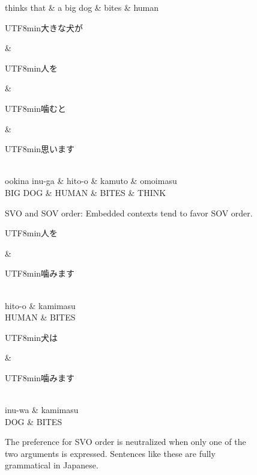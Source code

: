 \documentclass[11pt,a4paper]{article}
\newcommand{\japanese}[1]{\begin{CJK}{UTF8}{min}#1\end{CJK}}
\begin{document}
\begin{figure}
\begin{dependency}[theme = simple]
   \begin{deptext}[column sep=1em]
       thinks that \& a big dog \& bites \& human  \\
   \end{deptext}
\end{dependency}
\begin{dependency}[theme = simple]
   \begin{deptext}[column sep=1em]
   \japanese{大きな犬が} \& \japanese{人を} \& \japanese{噛むと} \& \japanese{思います}\\ 
   ookina inu-ga \& hito-o \& kamuto \& omoimasu \\
         BIG DOG \& HUMAN \& BITES \& THINK \\
   \end{deptext}
\end{dependency}
        \caption{SVO and SOV order: Embedded contexts tend to favor SOV order.}
        \label{fig:sent-dep-embedded}
\end{figure}




\begin{figure}
\begin{dependency}[theme = simple]
   \begin{deptext}[column sep=1em]
   \japanese{人を} \& \japanese{噛みます}\\ 
   hito-o \& kamimasu \\
   HUMAN \& BITES  \\
   \end{deptext}
\end{dependency}
\begin{dependency}[theme = simple]
   \begin{deptext}[column sep=1em]
   \japanese{犬は} \& \japanese{噛みます}\\ 
   inu-wa \& kamimasu \\
          DOG \& BITES  \\
   \end{deptext}
\end{dependency}
    \caption{The preference for SVO order is neutralized when only one of the two arguments is expressed. Sentences like these are fully grammatical in Japanese.}
    \label{fig:sent-dep-1arg}
\end{figure}
\end{document}
